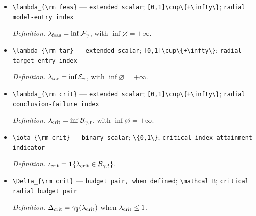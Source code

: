 \documentclass{article}
\begin{document}
\begin{itemize}
  \item \texttt{\textbackslash{}\allowbreak{}lambda\_\allowbreak{}\{\textbackslash{}\allowbreak{}rm feas\}\allowbreak{}} --- \texttt{extended scalar}; \texttt{[0,\allowbreak{}1]\textbackslash{}\allowbreak{}cup\textbackslash{}\allowbreak{}\{+\allowbreak{}\textbackslash{}\allowbreak{}infty\textbackslash{}\allowbreak{}\}\allowbreak{}}; \texttt{radial model-\allowbreak{}entry index}
  \par\smallskip\noindent\emph{Definition.} \(\lambda_{\rm feas}=\inf\mathcal F_\gamma\), with \(\inf\varnothing=+\infty\).
  \item \texttt{\textbackslash{}\allowbreak{}lambda\_\allowbreak{}\{\textbackslash{}\allowbreak{}rm tar\}\allowbreak{}} --- \texttt{extended scalar}; \texttt{[0,\allowbreak{}1]\textbackslash{}\allowbreak{}cup\textbackslash{}\allowbreak{}\{+\allowbreak{}\textbackslash{}\allowbreak{}infty\textbackslash{}\allowbreak{}\}\allowbreak{}}; \texttt{radial target-\allowbreak{}entry index}
  \par\smallskip\noindent\emph{Definition.} \(\lambda_{\rm tar}=\inf\mathcal E_\gamma\), with \(\inf\varnothing=+\infty\).
  \item \texttt{\textbackslash{}\allowbreak{}lambda\_\allowbreak{}\{\textbackslash{}\allowbreak{}rm crit\}\allowbreak{}} --- \texttt{extended scalar}; \texttt{[0,\allowbreak{}1]\textbackslash{}\allowbreak{}cup\textbackslash{}\allowbreak{}\{+\allowbreak{}\textbackslash{}\allowbreak{}infty\textbackslash{}\allowbreak{}\}\allowbreak{}}; \texttt{radial conclusion-\allowbreak{}failure index}
  \par\smallskip\noindent\emph{Definition.} \(\lambda_{\rm crit}=\inf\mathcal B_{\gamma,t}\), with \(\inf\varnothing=+\infty\).
  \item \texttt{\textbackslash{}\allowbreak{}iota\_\allowbreak{}\{\textbackslash{}\allowbreak{}rm crit\}\allowbreak{}} --- \texttt{binary scalar}; \texttt{\textbackslash{}\allowbreak{}\{0,\allowbreak{}1\textbackslash{}\allowbreak{}\}\allowbreak{}}; \texttt{critical-\allowbreak{}index attainment indicator}
  \par\smallskip\noindent\emph{Definition.} \(\iota_{\rm crit}=\mathbf 1\{\lambda_{\rm crit}\in\mathcal B_{\gamma,t}\}\).
  \item \texttt{\textbackslash{}\allowbreak{}Delta\_\allowbreak{}\{\textbackslash{}\allowbreak{}rm crit\}\allowbreak{}} --- \texttt{budget pair,\allowbreak{} when defined}; \texttt{\textbackslash{}\allowbreak{}mathcal B}; \texttt{critical radial budget pair}
  \par\smallskip\noindent\emph{Definition.} \(\Delta_{\rm crit}=\gamma_{\bar{\boldsymbol\delta}}(\lambda_{\rm crit})\) when \(\lambda_{\rm crit}\leq1\).
\end{itemize}
\end{document}
